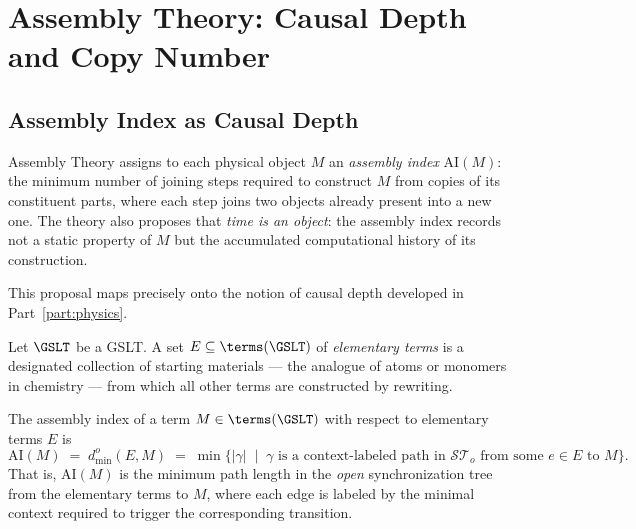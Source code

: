 \chapter{Assembly Theory: Causal Depth and Copy Number}
\label{sec:assembly}

\section{Assembly Index as Causal Depth}

Assembly Theory assigns to each physical object $M$ an
\emph{assembly index} $\mathrm{AI}(M)$: the minimum number of
joining steps required to construct $M$ from copies of its
constituent parts, where each step joins two objects already
present into a new one.
The theory also proposes that \emph{time is an object}: the
assembly index records not a static property of $M$ but the
accumulated computational history of its construction.

This proposal maps precisely onto the notion of causal depth
developed in Part~\ref{part:physics}.

\begin{definition}
Let $\GSLT$ be a GSLT.
A set $E \subseteq \terms(\GSLT)$ of \emph{elementary terms}
is a designated collection of starting materials --- the analogue
of atoms or monomers in chemistry --- from which all other terms
are constructed by rewriting.
\end{definition}

\begin{proposition}
\label{prop:assembly-index}
The assembly index of a term $M \in \terms(\GSLT)$ with respect
to elementary terms $E$ is
\[
  \mathrm{AI}(M) \;=\; d^o_{\min}(E, M)
  \;=\; \min\bigl\{ |\gamma| \;\mid\;
    \gamma \text{ is a context-labeled path in } \mathcal{ST}_o
    \text{ from some } e \in E \text{ to } M
  \bigr\}.
\]
That is, $\mathrm{AI}(M)$ is the minimum path length in the
\emph{open} synchronization tree from the elementary terms to $M$,
where each edge is labeled by the minimal context required to
trigger the corresponding transition.
\end{proposition}

